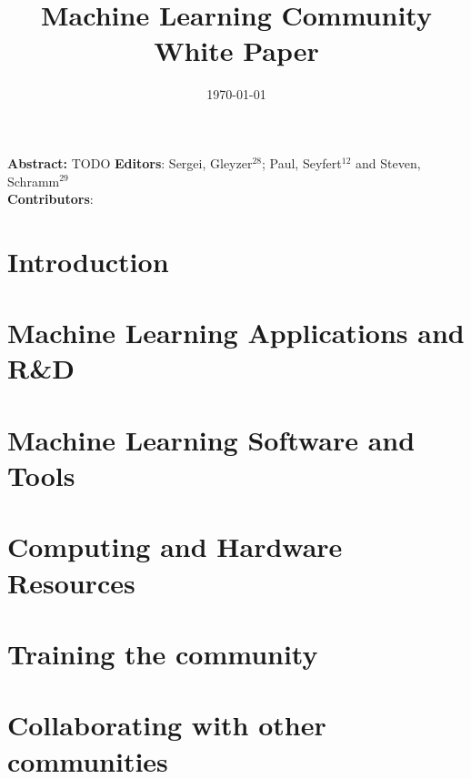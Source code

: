 \documentclass{article}
\title{Machine Learning Community White Paper}
\date{\today}
\begin{document}
\normalsize



\clearpage


\maketitle

\setlength\parindent{0pt}
\textbf{Abstract:} TODO
\vskip 1cm
\textbf{Editors}: Sergei, Gleyzer$^{28}$; Paul, Seyfert$^{12}$ and Steven, Schramm$^{29}$\\
\newline
\textbf{Contributors}:


\tableofcontents
\clearpage

\section{Introduction}
\label{sec:introduction}


\section{Machine Learning Applications and R\&D}
\label{sec:applications}


\section{Machine Learning Software and Tools}
\label{sec:software}


%

\section{Computing and Hardware Resources}
\label{sec:resources}


\section{Training the community}
\label{sec:training}


\section{Collaborating with other communities}
\label{sec:collaboration}

\end{document}
